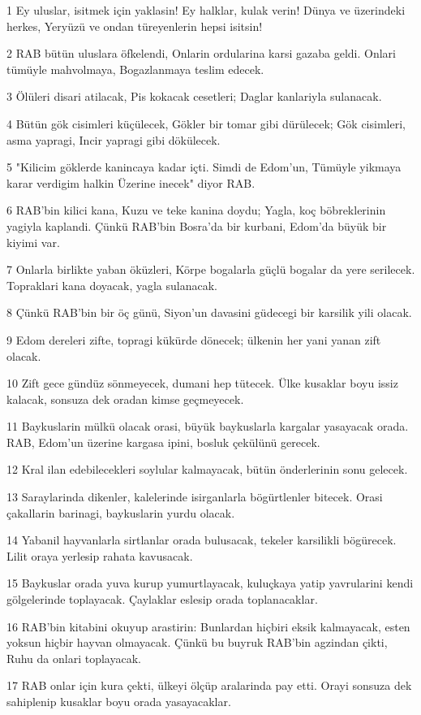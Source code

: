 \par 1 Ey uluslar, isitmek için yaklasin! Ey halklar, kulak verin! Dünya ve üzerindeki herkes, Yeryüzü ve ondan türeyenlerin hepsi isitsin!
\par 2 RAB bütün uluslara öfkelendi, Onlarin ordularina karsi gazaba geldi. Onlari tümüyle mahvolmaya, Bogazlanmaya teslim edecek.
\par 3 Ölüleri disari atilacak, Pis kokacak cesetleri; Daglar kanlariyla sulanacak.
\par 4 Bütün gök cisimleri küçülecek, Gökler bir tomar gibi dürülecek; Gök cisimleri, asma yapragi, Incir yapragi gibi dökülecek.
\par 5 "Kilicim göklerde kanincaya kadar içti. Simdi de Edom'un, Tümüyle yikmaya karar verdigim halkin Üzerine inecek" diyor RAB.
\par 6 RAB'bin kilici kana, Kuzu ve teke kanina doydu; Yagla, koç böbreklerinin yagiyla kaplandi. Çünkü RAB'bin Bosra'da bir kurbani, Edom'da büyük bir kiyimi var.
\par 7 Onlarla birlikte yaban öküzleri, Körpe bogalarla güçlü bogalar da yere serilecek. Topraklari kana doyacak, yagla sulanacak.
\par 8 Çünkü RAB'bin bir öç günü, Siyon'un davasini güdecegi bir karsilik yili olacak.
\par 9 Edom dereleri zifte, topragi kükürde dönecek; ülkenin her yani yanan zift olacak.
\par 10 Zift gece gündüz sönmeyecek, dumani hep tütecek. Ülke kusaklar boyu issiz kalacak, sonsuza dek oradan kimse geçmeyecek.
\par 11 Baykuslarin mülkü olacak orasi, büyük baykuslarla kargalar yasayacak orada. RAB, Edom'un üzerine kargasa ipini, bosluk çekülünü gerecek.
\par 12 Kral ilan edebilecekleri soylular kalmayacak, bütün önderlerinin sonu gelecek.
\par 13 Saraylarinda dikenler, kalelerinde isirganlarla bögürtlenler bitecek. Orasi çakallarin barinagi, baykuslarin yurdu olacak.
\par 14 Yabanil hayvanlarla sirtlanlar orada bulusacak, tekeler karsilikli bögürecek. Lilit oraya yerlesip rahata kavusacak.
\par 15 Baykuslar orada yuva kurup yumurtlayacak, kuluçkaya yatip yavrularini kendi gölgelerinde toplayacak. Çaylaklar eslesip orada toplanacaklar.
\par 16 RAB'bin kitabini okuyup arastirin: Bunlardan hiçbiri eksik kalmayacak, esten yoksun hiçbir hayvan olmayacak. Çünkü bu buyruk RAB'bin agzindan çikti, Ruhu da onlari toplayacak.
\par 17 RAB onlar için kura çekti, ülkeyi ölçüp aralarinda pay etti. Orayi sonsuza dek sahiplenip kusaklar boyu orada yasayacaklar.

